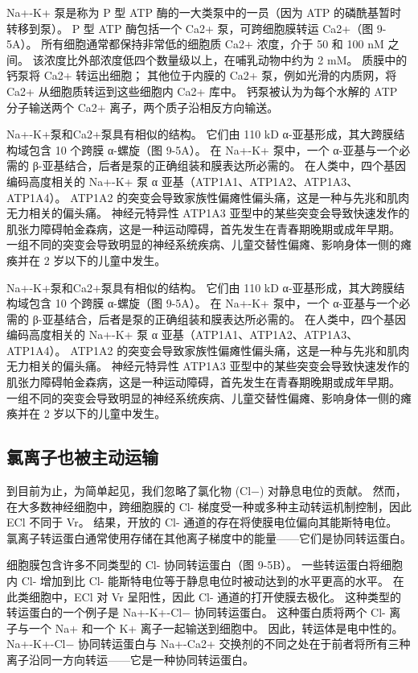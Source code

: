 Na+-K+ 泵是称为 P 型 ATP 酶的一大类泵中的一员（因为 ATP 的磷酰基暂时转移到泵）。 
P 型 ATP 酶包括一个 Ca2+ 泵，可跨细胞膜转运 Ca2+（图 9-5A）。 
所有细胞通常都保持非常低的细胞质 Ca2+ 浓度，介于 50 和 100 nM 之间。 
该浓度比外部浓度低四个数量级以上，在哺乳动物中约为 2 mM。 
质膜中的钙泵将 Ca2+ 转运出细胞； 其他位于内膜的 Ca2+ 泵，例如光滑的内质网，将 Ca2+ 从细胞质转运到这些细胞内 Ca2+ 库中。 
钙泵被认为为每个水解的 ATP 分子输送两个 Ca2+ 离子，两个质子沿相反方向输送。


Na+-K+泵和Ca2+泵具有相似的结构。 
它们由 110 kD α-亚基形成，其大跨膜结构域包含 10 个跨膜 α-螺旋（图 9-5A）。 
在 Na+-K+ 泵中，一个 α-亚基与一个必需的 β-亚基结合，后者是泵的正确组装和膜表达所必需的。 
在人类中，四个基因编码高度相关的 Na+-K+ 泵 α 亚基（ATP1A1、ATP1A2、ATP1A3、ATP1A4）。 
ATP1A2 的突变会导致家族性偏瘫性偏头痛，这是一种与先兆和肌肉无力相关的偏头痛。 
神经元特异性 ATP1A3 亚型中的某些突变会导致快速发作的肌张力障碍帕金森病，这是一种运动障碍，首先发生在青春期晚期或成年早期。 
一组不同的突变会导致明显的神经系统疾病、儿童交替性偏瘫、影响身体一侧的瘫痪并在 2 岁以下的儿童中发生。


Na+-K+泵和Ca2+泵具有相似的结构。 
它们由 110 kD α-亚基形成，其大跨膜结构域包含 10 个跨膜 α-螺旋（图 9-5A）。 
在 Na+-K+ 泵中，一个 α-亚基与一个必需的 β-亚基结合，后者是泵的正确组装和膜表达所必需的。 
在人类中，四个基因编码高度相关的 Na+-K+ 泵 α 亚基（ATP1A1、ATP1A2、ATP1A3、ATP1A4）。 ATP1A2 的突变会导致家族性偏瘫性偏头痛，这是一种与先兆和肌肉无力相关的偏头痛。 
神经元特异性 ATP1A3 亚型中的某些突变会导致快速发作的肌张力障碍帕金森病，这是一种运动障碍，首先发生在青春期晚期或成年早期。 
一组不同的突变会导致明显的神经系统疾病、儿童交替性偏瘫、影响身体一侧的瘫痪并在 2 岁以下的儿童中发生。



\subsection{氯离子也被主动运输}
到目前为止，为简单起见，我们忽略了氯化物 (Cl−) 对静息电位的贡献。 
然而，在大多数神经细胞中，跨细胞膜的 Cl- 梯度受一种或多种主动转运机制控制，因此 ECl 不同于 Vr。 
结果，开放的 Cl- 通道的存在将使膜电位偏向其能斯特电位。 
氯离子转运蛋白通常使用存储在其他离子梯度中的能量——它们是协同转运蛋白。


细胞膜包含许多不同类型的 Cl- 协同转运蛋白（图 9-5B）。 
一些转运蛋白将细胞内 Cl- 增加到比 Cl- 能斯特电位等于静息电位时被动达到的水平更高的水平。 
在此类细胞中，ECl 对 Vr 呈阳性，因此 Cl- 通道的打开使膜去极化。 
这种类型的转运蛋白的一个例子是 Na+-K+-Cl− 协同转运蛋白。 
这种蛋白质将两个 Cl- 离子与一个 Na+ 和一个 K+ 离子一起输送到细胞中。 
因此，转运体是电中性的。 
Na+-K+-Cl− 协同转运蛋白与 Na+-Ca2+ 交换剂的不同之处在于前者将所有三种离子沿同一方向转运——它是一种协同转运蛋白。


